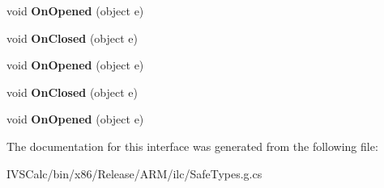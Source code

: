 \begin{DoxyCompactItemize}
void {\bfseries On\+Opened} (object e)
\item 
\mbox{\label{interface_windows_1_1_u_i_1_1_xaml_1_1_controls_1_1_i_app_bar_overrides_ae6cf198b7cd78c76b94fbd05c8a1eb4e}} 
void {\bfseries On\+Closed} (object e)
\item 
\mbox{\label{interface_windows_1_1_u_i_1_1_xaml_1_1_controls_1_1_i_app_bar_overrides_a5f15620e64137a972d69545b7ee2f08d}} 
void {\bfseries On\+Opened} (object e)
\item 
\mbox{\label{interface_windows_1_1_u_i_1_1_xaml_1_1_controls_1_1_i_app_bar_overrides_ae6cf198b7cd78c76b94fbd05c8a1eb4e}} 
void {\bfseries On\+Closed} (object e)
\item 
\mbox{\label{interface_windows_1_1_u_i_1_1_xaml_1_1_controls_1_1_i_app_bar_overrides_a5f15620e64137a972d69545b7ee2f08d}} 
void {\bfseries On\+Opened} (object e)
\end{DoxyCompactItemize}


The documentation for this interface was generated from the following file\+:\begin{DoxyCompactItemize}
\item 
I\+V\+S\+Calc/bin/x86/\+Release/\+A\+R\+M/ilc/Safe\+Types.\+g.\+cs\end{DoxyCompactItemize}
